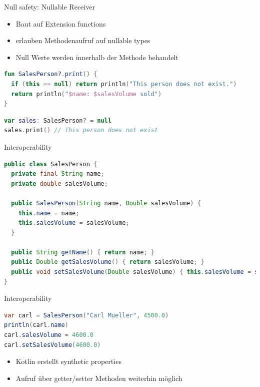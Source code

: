 \documentclass{beamer}
\begin{document}
\begin{frame}[fragile]{Null safety: Nullable Receiver}
  \begin{itemize}[<+->]
    \item Baut auf Extension functions
    \item erlauben Methodenaufruf auf nullable types
    \item Null Werte werden innerhalb der Methode behandelt
  \end{itemize}
  \pause \vspace{1cm}
  \begin{lstlisting}[language=Kotlin]
fun SalesPerson?.print() {
  if (this == null) return println("This person does not exist.")
  return println("$name: $salesVolume sold")
}
  \end{lstlisting}
  \pause
  \begin{lstlisting}[language=Kotlin]
var sales: SalesPerson? = null
sales.print() // This person does not exist
  \end{lstlisting}
\end{frame}

\begin{frame}[fragile]{Interoperability}
  \begin{lstlisting}[language=Java]
public class SalesPerson {
  private final String name;
  private double salesVolume;

  public SalesPerson(String name, Double salesVolume) {
    this.name = name;
    this.salesVolume = salesVolume;
  }

  public String getName() { return name; }
  public Double getSalesVolume() { return salesVolume; }
  public void setSalesVolume(Double salesVolume) { this.salesVolume = salesVolume; }
}
  \end{lstlisting}
\end{frame}

\begin{frame}[fragile]{Interoperability}
  \begin{lstlisting}[language=Java]
var carl = SalesPerson("Carl Mueller", 4500.0)
println(carl.name)
carl.salesVolume = 4600.0
carl.setSalesVolume(4600.0)
  \end{lstlisting}
  \begin{itemize}
    \item Kotlin erstellt synthetic properties
    \item Aufruf über getter/setter Methoden weiterhin möglich
  \end{itemize}
\end{frame}
\end{document}
